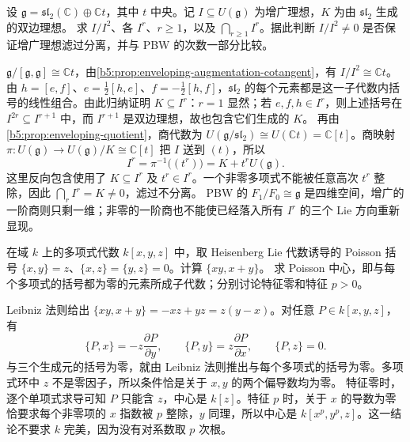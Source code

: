 \begin{exercise}\label{b5:ex:15-perfect-augmentation}
	设 \(\mathfrak g=\mathfrak{sl}_2(\mathbb C)\oplus\mathbb Ct\)，其中 \(t\) 中央。记 \(I\subseteq U(\mathfrak g)\) 为增广理想，\(K\) 为由 \(\mathfrak{sl}_2\) 生成的双边理想。 求 \(I/I^2\)、各 \(I^r\)、\(r\ge1\)，以及 \(\bigcap_{r\ge1}I^r\)。据此判断 \(I/I^2\ne0\) 是否保证增广理想滤过分离，并与 PBW 的次数一部分比较。
\end{exercise}
\begin{solution}
	\(\mathfrak g/[\mathfrak g,\mathfrak g]\cong\mathbb Ct\)，由\cref{b5:prop:enveloping-augmentation-cotangent}，有 \(I/I^2\cong\mathbb Ct\)。 由 \(h=[e,f]\)、\(e=\frac12[h,e]\)、\(f=-\frac12[h,f]\)，\(\mathfrak{sl}_2\) 的每个元素都是这一子代数内括号的线性组合。由此归纳证明 \(K\subseteq I^r\)：\(r=1\) 显然；若 \(e,f,h\in I^r\)，则上述括号在 \(I^{2r}\subseteq I^{r+1}\) 中，而 \(I^{r+1}\) 是双边理想，故也包含它们生成的 \(K\)。 再由\cref{b5:prop:enveloping-quotient}，商代数为 \(U(\mathfrak g/\mathfrak{sl}_2)\cong U(\mathbb Ct)=\mathbb C[t]\)。商映射 \(\pi:U(\mathfrak g)\to U(\mathfrak g)/K\cong\mathbb C[t]\) 把 \(I\) 送到 \((t)\)，所以
	\[
		I^r=\pi^{-1}\bigl((t^r)\bigr)=K+t^rU(\mathfrak g).
	\]
	这里反向包含使用了 \(K\subseteq I^r\) 及 \(t^r\in I^r\)。一个非零多项式不能被任意高次 \(t^r\) 整除，因此 \(\bigcap_rI^r=K\ne0\)，滤过不分离。 PBW 的 \(F_1/F_0\cong\mathfrak g\) 是四维空间，增广的一阶商则只剩一维；非零的一阶商也不能使已经落入所有 \(I^r\) 的三个 Lie 方向重新显现。
\end{solution}

\begin{exercise}\label{b5:ex:15-filtered-poisson}
	在域 \(k\) 上的多项式代数 \(k[x,y,z]\) 中，取 Heisenberg Lie 代数诱导的 Poisson 括号 \(\{x,y\}=z\)、\(\{x,z\}=\{y,z\}=0\)。计算 \(\{xy,x+y\}\)。 求 Poisson 中心，即与每个多项式的括号都为零的元素所成子代数；分别讨论特征零和特征 \(p>0\)。
\end{exercise}
\begin{solution}
	Leibniz 法则给出 \(\{xy,x+y\}=-xz+yz=z(y-x)\)。对任意 \(P\in k[x,y,z]\)，有
	\[
		\{P,x\}=-z\frac{\partial P}{\partial y},\qquad \{P,y\}=z\frac{\partial P}{\partial x},\qquad \{P,z\}=0.
	\]
	与三个生成元的括号为零，就由 Leibniz 法则推出与每个多项式的括号为零。多项式环中 \(z\) 不是零因子，所以条件恰是关于 \(x,y\) 的两个偏导数均为零。 特征零时，逐个单项式求导可知 \(P\) 只能含 \(z\)，中心是 \(k[z]\)。特征 \(p\) 时，关于 \(x\) 的导数为零恰要求每个非零项的 \(x\) 指数被 \(p\) 整除，\(y\) 同理，所以中心是 \(k[x^p,y^p,z]\)。这一结论不要求 \(k\) 完美，因为没有对系数取 \(p\) 次根。
\end{solution}

